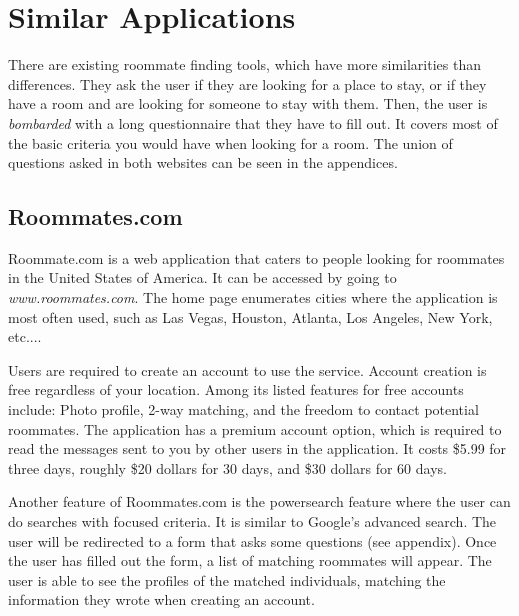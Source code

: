 \documentclass[journal]{./IEEE/IEEEtran}
\begin{document}
\section{Similar Applications}
There are existing roommate finding tools, which have more similarities than differences. They ask the user if they are looking for a place to stay, or if they have a room and are looking for someone to stay with them. Then, the user is \textit{bombarded} with a long questionnaire that they have to fill out. It covers most of the basic criteria you would have when looking for a room. The union of questions asked in both websites can be seen in the appendices.

\subsection{Roommates.com}
Roommate.com\cite{roommates.com} is a web application that caters to people looking for roommates in the United States of America. It can be accessed by going to \textit{www.roommates.com}. The home page enumerates cities where the application is most often used, such as Las Vegas, Houston, Atlanta, Los Angeles, New York, etc....

Users are required to create an account to use the service. Account creation is free regardless of your location. Among its listed features for free accounts include: Photo profile, 2-way matching, and the freedom to contact potential roommates. The application has a premium account option, which is required to read the messages sent to you by other users in the application. It costs \$5.99 for three days, roughly \$20 dollars for 30 days, and \$30 dollars for 60 days.

Another feature of Roommates.com is the powersearch feature where the user can do searches with focused criteria. It is similar to Google's advanced search. The user will be redirected to a form that asks some questions (see appendix). Once the user has filled out the form, a list of matching roommates will appear. The user is able to see the profiles of the matched individuals, matching the information they wrote when creating an account.
\end{document}
